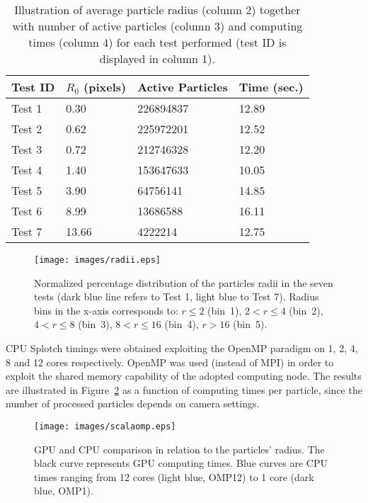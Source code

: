 \documentclass[1p]{elsarticle}
\begin{document}
\begin{table}
\begin{center}
\begin{tabular}{|l|l|l|l|}
\hline
Test ID & $R_0$ (pixels) & Active Particles & Time (sec.) \\
\hline
Test 1  & 0.30   & 226894837  & 12.89 \\
\hline
Test 2  & 0.62   & 225972201  & 12.52 \\
\hline
Test 3  & 0.72   & 212746328  & 12.20 \\
\hline
Test 4  & 1.40   & 153647633  & 10.05 \\
\hline
Test 5  & 3.90   & 64756141   & 14.85 \\
\hline
Test 6  & 8.99   & 13686588   & 16.11 \\
\hline
Test 7  & 13.66  & 4222214    & 12.75 \\
\hline
\end{tabular}
\end{center}
\caption{Illustration of average particle radius (column 2) together with number of active particles (column 3)
and computing times (column 4) for each test performed (test ID is displayed in column 1).}
\label{tab:radius}
\end{table}

\begin{figure}
\centering
\texttt{[image: images/radii.eps]}
\caption{Normalized percentage distribution of the particles radii in the seven tests (dark blue line refers to Test 1, light blue to Test 7). Radius bins in the x-axis corresponds to: $r\le 2$ (bin~1), $2<r\le 4$ (bin~2), $4<r\le 8$ (bin~3), $8<r\le 16$ (bin~4), $r>16$ (bin~5). 
}
\label{fig:radii}
\end{figure}

CPU Splotch timings were obtained exploiting the OpenMP paradigm on 1, 2, 4, 8 and 12 cores respectively. OpenMP was used (instead of MPI) in order to exploit the shared memory capability of the adopted computing node. The results are illustrated in Figure~\ref{fig:gpucpu} as a function of computing times per particle, since the number of processed particles depends on camera settings.

\begin{figure}
\centering
\texttt{[image: images/scalaomp.eps]}
\caption{GPU and CPU comparison in relation to the particles' radius. The black curve represents GPU computing times. Blue curves are CPU times ranging from 12 cores (light blue, OMP12) to 1 core (dark blue, OMP1).}
\label{fig:gpucpu}
\end{figure}
\end{document}

